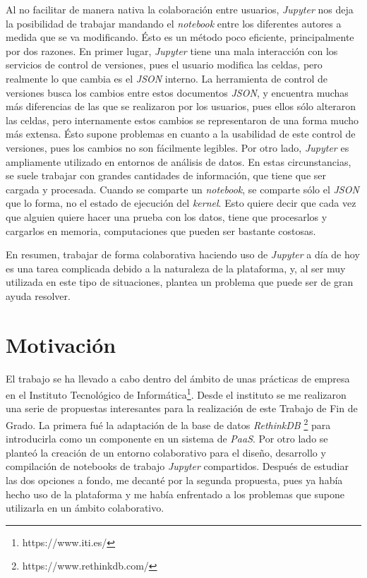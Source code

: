 \documentclass[11pt,spanish,listoffigures]{tfgetsinf}
\begin{document}
Al no facilitar de manera nativa la colaboración entre usuarios, \textit{Jupyter} nos deja la posibilidad de trabajar mandando el \textit{notebook} entre los diferentes autores a medida que se va modificando. Ésto es un método poco eficiente, principalmente por dos razones. En primer lugar, \textit{Jupyter} tiene una mala interacción con los servicios de control de versiones, pues el usuario modifica las celdas, pero realmente lo que cambia es el \textit{JSON} interno. La herramienta de control de versiones busca los cambios entre estos documentos \textit{JSON}, y encuentra muchas más diferencias de las que se realizaron por los usuarios, pues ellos sólo alteraron las celdas, pero internamente estos cambios se representaron de una forma mucho más extensa. Ésto supone problemas en cuanto a la usabilidad de este control de versiones, pues los cambios no son fácilmente legibles. 
Por otro lado, \textit{Jupyter} es ampliamente utilizado en entornos de análisis de datos. En estas circunstancias, se suele trabajar con grandes cantidades de información, que tiene que ser cargada y procesada. Cuando se comparte un \textit{notebook}, se comparte sólo el \textit{JSON} que lo forma, no el estado de ejecución del \textit{kernel}. Esto quiere decir que cada vez que alguien quiere hacer una prueba con los datos, tiene que procesarlos y cargarlos en memoria, computaciones que pueden ser bastante costosas.

En resumen, trabajar de forma colaborativa haciendo uso de \textit{Jupyter} a día de hoy es una tarea complicada debido a la naturaleza de la plataforma, y, al ser muy utilizada en este tipo de situaciones, plantea un problema que puede ser de gran ayuda resolver.



\section{Motivaci\'on}
\label{sec:motivacion}

El trabajo se ha llevado a cabo dentro del ámbito de unas prácticas de empresa en el Instituto Tecnológico de Informática\footnote{https://www.iti.es/}. Desde el instituto se me realizaron una serie de propuestas interesantes para la realización de este Trabajo de Fin de Grado. La primera fué la adaptación de la base de datos \textit{RethinkDB} \footnote{https://www.rethinkdb.com/} para introducirla como un componente en un sistema de \textit{PaaS}. Por otro lado se planteó la creación de un entorno colaborativo para el diseño, desarrollo y compilación de notebooks de trabajo \textit{Jupyter} compartidos. Después de estudiar las dos opciones a fondo, me decanté por la segunda propuesta, pues ya había hecho uso de la plataforma y me había enfrentado a los problemas que supone utilizarla en un ámbito colaborativo.
\end{document}
